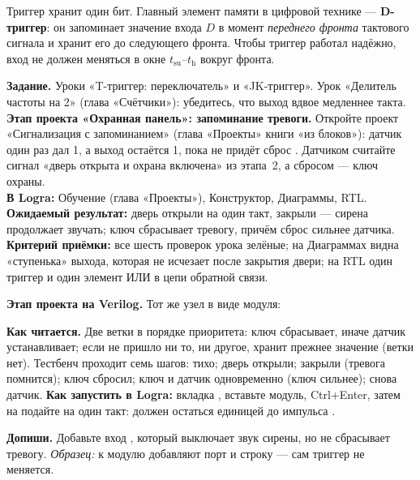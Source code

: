 \begin{ideabox}
Триггер хранит один бит. Главный элемент памяти в цифровой технике ---
\textbf{D-триггер}: он запоминает значение входа $D$ в момент \emph{переднего
фронта} тактового сигнала и хранит его до следующего фронта. Чтобы
триггер работал надёжно, вход не должен меняться в окне $t_\text{su}$--$t_\text{h}$
вокруг фронта.
\end{ideabox}

\begin{diybox}
\textbf{Задание.}  Уроки «T-триггер: переключатель» и «JK-триггер».
 Урок «Делитель частоты на 2» (глава «Счётчики»): убедитесь, что
выход вдвое медленнее такта.  \textbf{Этап проекта «Охранная панель»:
запоминание тревоги.} Откройте проект «Сигнализация с запоминанием» (глава
«Проекты» книги «из блоков»): датчик  один раз дал 1, а
выход  остаётся 1, пока не придёт сброс . Датчиком
считайте сигнал «дверь открыта и охрана включена» из этапа~2, а сбросом ---
ключ охраны.\\
\textbf{В Logra:} Обучение (глава «Проекты»), Конструктор, Диаграммы, RTL.\\
\textbf{Ожидаемый результат:} дверь открыли на один такт, закрыли --- сирена
продолжает звучать; ключ сбрасывает тревогу, причём сброс сильнее датчика.\\
\textbf{Критерий приёмки:} все шесть проверок урока зелёные; на Диаграммах
видна «ступенька» выхода, которая не исчезает после закрытия двери; на RTL
один триггер и один элемент ИЛИ в цепи обратной связи.
\end{diybox}

\textbf{Этап проекта на Verilog.} Тот же узел в виде модуля:


\textbf{Как читается.} Две ветки в порядке приоритета: ключ сбрасывает,
иначе датчик устанавливает; если не пришло ни то, ни другое, 
хранит прежнее значение (ветки  нет). Тестбенч
 проходит семь шагов: тихо; дверь открыли; закрыли
(тревога помнится); ключ сбросил; ключ и датчик одновременно (ключ сильнее);
снова датчик. \textbf{Как запустить в Logra:} вкладка , вставьте
модуль, Ctrl+Enter, затем на  подайте  на один
такт:  должен остаться единицей до импульса .

\textbf{Допиши.} Добавьте вход , который выключает звук сирены, но
не сбрасывает тревогу. \emph{Образец:} к модулю добавляют порт
 и строку 
--- сам триггер не меняется.

